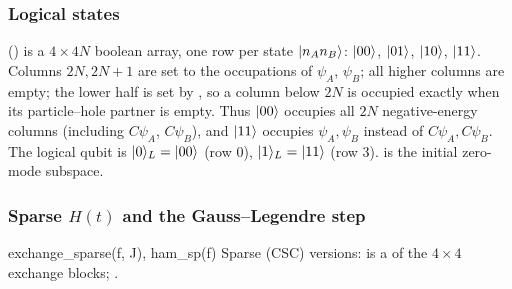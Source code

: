 \subsubsection*{Logical states}

 () is a $4\times4N$ boolean array, one row per state $|n_An_B\rangle$: $|00\rangle$, $|01\rangle$, $|10\rangle$, $|11\rangle$. Columns $2N, 2N+1$
are set to the occupations of $\psi_A$, $\psi_B$; all higher columns are empty; the lower half is set by
, so a column below $2N$ is occupied exactly when its particle--hole partner
is empty. Thus $|00\rangle$ occupies all $2N$ negative-energy columns (including $C\psi_A$, $C\psi_B$), and $|11\rangle$ occupies $\psi_A,\psi_B$
instead of $C\psi_A, C\psi_B$. The logical qubit is $|0\rangle_L = |00\rangle$ (row 0), $|1\rangle_L = |11\rangle$ (row 3).  is
the initial zero-mode subspace.

\subsubsection*{Sparse $H(t)$ and the Gauss--Legendre step}

\begin{function}{exchange\_sparse(f, J), ham\_sp(f)}
Sparse (CSC) versions:  is a  of the $4\times4$ exchange blocks; .
\end{function}

